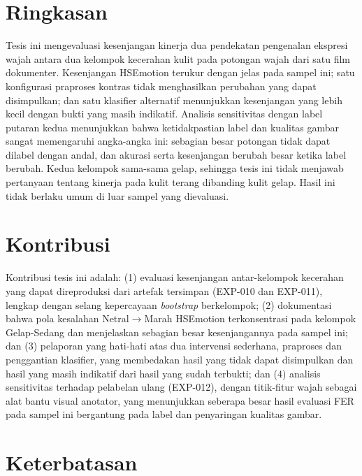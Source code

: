 \section{Ringkasan}
\label{sec:summary}

Tesis ini mengevaluasi kesenjangan kinerja dua pendekatan pengenalan ekspresi wajah antara dua kelompok kecerahan kulit pada potongan wajah dari satu film dokumenter. Kesenjangan HSEmotion terukur dengan jelas pada sampel ini; satu konfigurasi praproses kontras tidak menghasilkan perubahan yang dapat disimpulkan; dan satu klasifier alternatif menunjukkan kesenjangan yang lebih kecil dengan bukti yang masih indikatif. Analisis sensitivitas dengan label putaran kedua menunjukkan bahwa ketidakpastian label dan kualitas gambar sangat memengaruhi angka-angka ini: sebagian besar potongan tidak dapat dilabel dengan andal, dan akurasi serta kesenjangan berubah besar ketika label berubah. Kedua kelompok sama-sama gelap, sehingga tesis ini tidak menjawab pertanyaan tentang kinerja pada kulit terang dibanding kulit gelap. Hasil ini tidak berlaku umum di luar sampel yang dievaluasi.

\section{Kontribusi}

Kontribusi tesis ini adalah: (1) evaluasi kesenjangan antar-kelompok kecerahan yang dapat direproduksi dari artefak tersimpan (EXP-010 dan EXP-011), lengkap dengan selang kepercayaan \textit{bootstrap} berkelompok; (2) dokumentasi bahwa pola kesalahan Netral$\to$Marah HSEmotion terkonsentrasi pada kelompok Gelap-Sedang dan menjelaskan sebagian besar kesenjangannya pada sampel ini; dan (3) pelaporan yang hati-hati atas dua intervensi sederhana, praproses dan penggantian klasifier, yang membedakan hasil yang tidak dapat disimpulkan dan hasil yang masih indikatif dari hasil yang sudah terbukti; dan (4) analisis sensitivitas terhadap pelabelan ulang (EXP-012), dengan titik-fitur wajah sebagai alat bantu visual anotator, yang menunjukkan seberapa besar hasil evaluasi FER pada sampel ini bergantung pada label dan penyaringan kualitas gambar.

\section{Keterbatasan}

